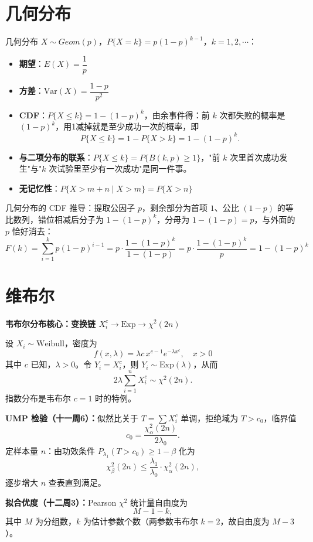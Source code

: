 \section{几何分布}
几何分布 $X\sim Geom(p)$，$P\{X=k\}=p(1-p)^{k-1}$，$k=1,2,\cdots$：
\begin{itemize}
    \item \textbf{期望}：$E(X) = \dfrac{1}{p}$
    \item \textbf{方差}：$\text{Var}(X) = \dfrac{1-p}{p^2}$
    \item \textbf{CDF}：$P\{X\leq k\} = 1-(1-p)^k$，由余事件得：前 $k$ 次都失败的概率是 $(1-p)^k$，用1减掉就是至少成功一次的概率，即
    \[
    P\{X \leq k\} = 1 - P\{X > k\} = 1-(1-p)^k.
    \]
    \item \textbf{与二项分布的联系}：$P\{X \leq k\} = P\{B(k,p) \geq 1\}$，"前 $k$ 次里首次成功发生"与"$k$ 次试验里至少有一次成功"是同一件事。
    \item \textbf{无记忆性}：$P\{X>m+n \mid X>m\} = P\{X>n\}$
\end{itemize}
\begin{dxtips}[几何分布就是k次完成一次的概率]
   
几何分布的 CDF 推导：提取公因子 $p$，剩余部分为首项 $1$、公比 $(1-p)$ 的等比数列，错位相减后分子为 $1-(1-p)^k$，分母为 $1-(1-p)=p$，与外面的 $p$ 恰好消去：
$$F(k) = \sum_{i=1}^{k} p(1-p)^{i-1} = p \cdot \frac{1-(1-p)^k}{1-(1-p)} = p \cdot \frac{1-(1-p)^k}{p} = 1-(1-p)^k$$

\end{dxtips}
\section{维布尔}
\begin{note}
\textbf{韦布尔分布核心：变换链 $X_i^c \to \text{Exp} \to \chi^2(2n)$}

设 $X_i \sim \text{Weibull}$，密度为
\[
f(x,\lambda) = \lambda c\, x^{c-1} e^{-\lambda x^c}, \quad x > 0
\]
其中 $c$ 已知，$\lambda > 0$。令 $Y_i = X_i^c$，则 $Y_i \sim \text{Exp}(\lambda)$，从而
\[
2\lambda \sum_{i=1}^n X_i^c \sim \chi^2(2n).
\]
指数分布是韦布尔 $c=1$ 时的特例。

\textbf{UMP 检验（十一周6）：}似然比关于 $T = \sum X_i^c$ 单调，拒绝域为 $T > c_0$，临界值
\[
c_0 = \frac{\chi^2_\alpha(2n)}{2\lambda_0}.
\]
定样本量 $n$：由功效条件 $P_{\lambda_1}(T > c_0) \geq 1-\beta$ 化为
\[
\chi^2_\beta(2n) \leq \frac{\lambda_1}{\lambda_0} \cdot \chi^2_\alpha(2n),
\]
逐步增大 $n$ 查表直到满足。

\textbf{拟合优度（十二周3）：}Pearson $\chi^2$ 统计量自由度为
\[
M - 1 - k,
\]
其中 $M$ 为分组数，$k$ 为估计参数个数（两参数韦布尔 $k=2$，故自由度为 $M-3$）。
\end{note}
